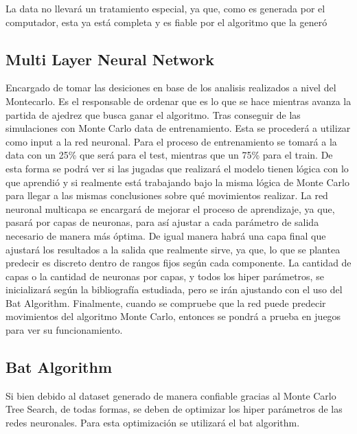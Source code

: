 La data no llevará un tratamiento especial, ya que, como es generada por el computador, esta ya está completa y es fiable por el algoritmo que la generó

\subsection{Multi Layer Neural Network}
Encargado de tomar las desiciones en base de los  analisis realizados a nivel del Montecarlo. Es el  responsable de ordenar que es lo que se hace mientras avanza la partida de ajedrez que busca ganar el algoritmo.\newline
Tras conseguir de las simulaciones con Monte Carlo data de entrenamiento. Esta se procederá a utilizar como input a la red neuronal.\newline
Para el proceso de entrenamiento se tomará a la data con un 25\% que será para el test, mientras que un 75\% para el train. De esta forma se podrá ver si las jugadas que realizará el modelo tienen lógica con lo que aprendió y si realmente está trabajando bajo la misma lógica de Monte Carlo para llegar a las mismas conclusiones sobre qué movimientos realizar.\newline
La red neuronal multicapa se encargará de mejorar el proceso de aprendizaje, ya que, pasará por capas de neuronas, para así ajustar a cada parámetro de salida necesario de manera más óptima. De igual manera habrá una capa final que ajustará los resultados a la salida que realmente sirve, ya que, lo que se plantea predecir es discreto dentro de rangos fijos según cada componente.\newline
La cantidad de capas o la cantidad de neuronas por capas, y todos los hiper parámetros, se inicializará según la bibliografía estudiada, pero se irán ajustando con el uso del Bat Algorithm.\newline
Finalmente, cuando se compruebe que la red puede predecir movimientos del algoritmo Monte Carlo, entonces se pondrá a prueba en juegos para ver su funcionamiento.

\subsection{Bat Algorithm}
Si bien debido al dataset generado de manera confiable gracias al Monte Carlo Tree Search, de todas formas, se deben de optimizar los hiper parámetros de las redes neuronales. Para esta optimización se utilizará el bat algorithm.




